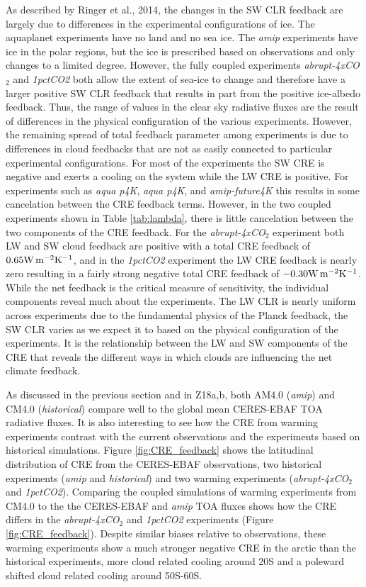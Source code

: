 \documentclass[draft]{agujournal2019}
\begin{document}
As described by Ringer et al., 2014, the changes in the SW CLR feedback are largely due to differences 
in the experimental configurations of ice.  The aquaplanet experiments have no land and no sea ice.  
The \textit{amip} experiments have ice in the polar regions, but the ice is prescribed based on observations and 
only changes to a limited degree.  However, the fully coupled experiments \textit{abrupt-4xCO$_2$} and 
\textit{1pctCO2} both allow the extent of sea-ice to change and therefore have a larger positive SW CLR
feedback that results in part from the positive ice-albedo feedback.  Thus, the range of values in the clear
sky radiative fluxes are the result of differences in the physical configuration of the various experiments.  
However, the remaining spread of total feedback parameter among experiments is due to differences
in cloud feedbacks that are not as easily connected to particular experimental configurations.  For 
most of the experiments the SW CRE is negative and exerts a cooling on the system while the 
LW CRE is positive.  For experiments such as \textit{aqua p4K}, \textit{aqua p4K}, and \textit{amip-future4K} 
this results in some cancelation between the CRE feedback terms.  However, in the 
two coupled experiments shown in Table \ref{tab:lambda}, there is little cancelation between
the two components of the CRE feedback.  For the
\textit{abrupt-4xCO$_2$} experiment both LW and SW cloud feedback are positive with a total 
CRE feedback of $0.65 \rm{W\, m^{-2} K^{-1}}$, and in the \textit{1pctCO2} experiment the LW 
CRE feedback is nearly zero 
resulting in a fairly strong  negative total CRE feedback of $-0.30 \rm{W\, m^{-2} K^{-1}}$.      
While the net feedback is the critical measure of sensitivity, the individual components 
reveal much about the experiments.  The LW CLR is nearly uniform across experiments 
due to the fundamental 
physics of the Planck feedback, the SW CLR varies as we expect it to based on the 
physical configuration of the experiments.  It is the relationship between the LW and SW 
components of the CRE that reveals the different ways in which clouds are influencing the 
net climate feedback.  

As discussed in the previous section and in Z18a,b, both AM4.0 (\textit{amip}) and 
CM4.0 (\textit{historical}) compare well to the global mean CERES-EBAF TOA radiative fluxes.  
It is also interesting to see how the CRE from warming experiments contrast with the current observations
and the experiments based on historical simulations. 
Figure \ref{fig:CRE_feedback} shows the latitudinal distribution of CRE from the CERES-EBAF
observations, two historical experiments (\textit{amip} and \textit{historical}) and two warming 
experiments (\textit{abrupt-4xCO$_2$} and \textit{1pctCO2}).    
Comparing the coupled simulations of warming experiments from CM4.0 to the the CERES-EBAF 
and \textit{amip} TOA fluxes shows how the CRE differs in the \textit{abrupt-4xCO$_2$} and 
\textit{1pctCO2} experiments (Figure \ref{fig:CRE_feedback}).
Despite similar biases relative to observations, these warming experiments show a much
stronger negative CRE in the arctic than the historical experiments, more cloud related 
cooling around 20S and a poleward shifted cloud related cooling around 50S-60S. 
\end{document}
